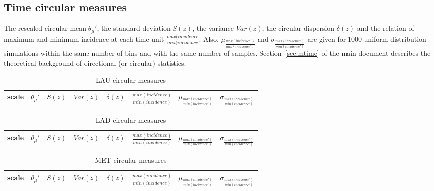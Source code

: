 \documentclass[%
 aip,
 jmp,%
 amsmath,amssymb,
 reprint,%
 floatfix,
]{revtex4-1}
\begin{document}
\subsection{Time circular measures}\label{si:circ}
The rescaled circular mean $\theta_\mu'$, the standard deviation $S(z)$, the variance $Var(z)$, the circular dispersion $\delta(z)$ and the relation of maximum and minimum incidence at each time unit $\frac{max(incidence}{min(incidence}$. Also, $ \mu_{\frac{max(incidence')}{min(incidence')}} $ and $ \sigma_{\frac{max(incidence')}{min(incidence')} }$ are given for 1000 uniform distribution simulations within the same number of bins and with the same number of samples. Section~\ref{sec:mtime} of the main document describes the theoretical background of directional (or circular) statistics.
\begin{table}[!h]
	\caption{LAU circular measures}
\begin{center}
    \begin{tabular}{ |l|| c|c|c|c|c||c|c| }
        \hline
scale & $\theta_\mu'$ & $S(z)$ & $Var(z)$ & $\delta(z)$ & $\frac{max(incidence)}{min(incidence)}$ & $ \mu_{\frac{max(incidence')}{min(incidence')}} $ & $ \sigma_{\frac{max(incidence')}{min(incidence')} } $ \\ \hline\hline
	
    \end{tabular}
\end{center}
\label{tab:circLau}
\end{table}
\begin{table}[!h]
	\caption{LAD circular measures}
\begin{center}
    \begin{tabular}{ |l|| c|c|c|c|c||c|c| }
        \hline
scale & $\theta_\mu'$ & $S(z)$ & $Var(z)$ & $\delta(z)$ & $\frac{max(incidence)}{min(incidence)}$ & $ \mu_{\frac{max(incidence')}{min(incidence')}} $ & $ \sigma_{\frac{max(incidence')}{min(incidence')} } $ \\ \hline\hline
	
    \end{tabular}
\end{center}
\label{tab:circLad}
\end{table}
\begin{table}[!h]
	\caption{MET circular measures}
\begin{center}
    \begin{tabular}{ |l|| c|c|c|c|c||c|c| }
        \hline
scale & $\theta_\mu'$ & $S(z)$ & $Var(z)$ & $\delta(z)$ & $\frac{max(incidence)}{min(incidence)}$ & $ \mu_{\frac{max(incidence')}{min(incidence')}} $ & $ \sigma_{\frac{max(incidence')}{min(incidence')} } $ \\ \hline\hline
	
    \end{tabular}
\end{center}
\label{tab:circMet}
\end{table}
\end{document}
